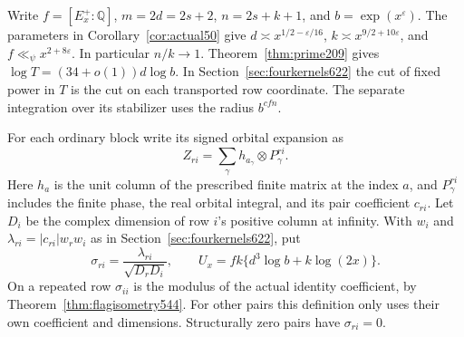 \documentclass[a4paper,11pt]{article}
\theoremstyle{definition}
\theoremstyle{remark}
\numberwithin{equation}{section}
\begin{document}
Write \(f=[E_x^+:\mathbb Q]\), \(m=2d=2s+2\), \(n=2s+k+1\), and
\(b=\exp(x^\varepsilon)\). The parameters in
Corollary~\ref{cor:actual50} give
\(d\asymp x^{1/2-\varepsilon/16}\), \(k\asymp x^{9/2+10\varepsilon}\),
and \(f\ll_\psi x^{2+8\varepsilon}\). In particular \(n/k\to1\).
Theorem~\ref{thm:prime209} gives \(\log T=(34+o(1))d\log b\).
In Section~\ref{sec:fourkernels622} the cut of fixed power in \(T\)
is the cut on each transported row coordinate. The separate
integration over its stabilizer uses the radius \(b^{cfn}\).

For each ordinary block write its signed orbital expansion as
\[
             Z_{ri}=\sum_{\gamma}h_{a_\gamma}\otimes P_\gamma^{ri}.
\]
Here \(h_a\) is the unit column of the prescribed finite matrix
at the index \(a\), and \(P_\gamma^{ri}\) includes the finite phase,
the real orbital integral, and its pair coefficient \(c_{ri}\).
Let \(D_i\) be the complex dimension of row \(i\)'s positive column
at infinity. With \(w_i\) and \(\lambda_{ri}=|c_{ri}|w_rw_i\) as in
Section~\ref{sec:fourkernels622}, put
\[
  \sigma_{ri}=\frac{\lambda_{ri}}{\sqrt{D_rD_i}},\qquad
  U_x=fk\{d^3\log b+k\log(2x)\}.
\]
On a repeated row \(\sigma_{ii}\) is the modulus of the actual
identity coefficient, by Theorem~\ref{thm:flagisometry544}.
For other pairs this definition only uses their own coefficient
and dimensions. Structurally zero pairs have \(\sigma_{ri}=0\).
\end{document}
